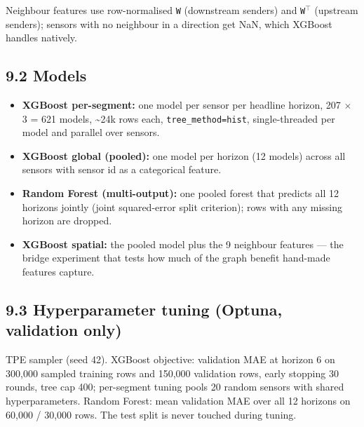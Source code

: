 \documentclass[10pt,a4paper]{article}
\begin{document}
Neighbour features use row-normalised \texttt{W} (downstream senders) and \texttt{W\ensuremath{^{\top}}} (upstream senders); sensors with no neighbour in a direction get NaN, which XGBoost handles natively.

\subsection*{9.2 Models}
\begin{itemize}[nosep,leftmargin=*]
\item \textbf{XGBoost per-segment:} one model per sensor per headline horizon, 207 \ensuremath{\times} 3 = 621 models, \textasciitilde{}24k rows each, \texttt{tree\_\allowbreak{}method=hist}, single-threaded per model and parallel over sensors.
\item \textbf{XGBoost global (pooled):} one model per horizon (12 models) across all sensors with sensor id as a categorical feature.
\item \textbf{Random Forest (multi-output):} one pooled forest that predicts all 12 horizons jointly (joint squared-error split criterion); rows with any missing horizon are dropped.
\item \textbf{XGBoost spatial:} the pooled model plus the 9 neighbour features --- the bridge experiment that tests how much of the graph benefit hand-made features capture.
\end{itemize}

\subsection*{9.3 Hyperparameter tuning (Optuna, validation only)}
TPE sampler (seed 42). XGBoost objective: validation MAE at horizon 6 on 300,000 sampled training rows and 150,000 validation rows, early stopping 30 rounds, tree cap 400; per-segment tuning pools 20 random sensors with shared hyperparameters. Random Forest: mean validation MAE over all 12 horizons on 60,000 /\allowbreak{} 30,000 rows. The test split is never touched during tuning.
\end{document}
